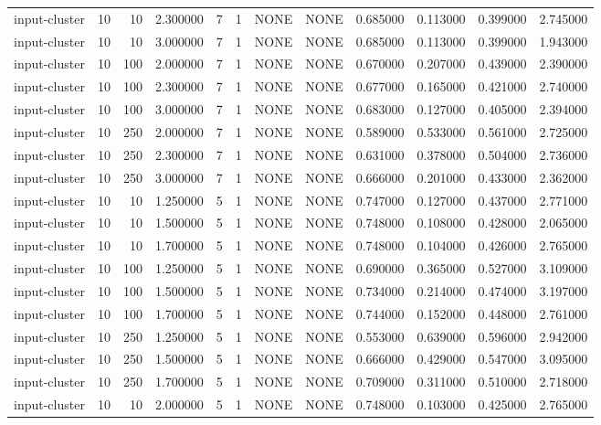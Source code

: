 \begin{tabular}{lrrrllllrrrr}
input-cluster & 10 & 10 & 2.300000 & 7 & 1 & NONE & NONE & 0.685000 & 0.113000 & 0.399000 & 2.745000 \\
input-cluster & 10 & 10 & 3.000000 & 7 & 1 & NONE & NONE & 0.685000 & 0.113000 & 0.399000 & 1.943000 \\
input-cluster & 10 & 100 & 2.000000 & 7 & 1 & NONE & NONE & 0.670000 & 0.207000 & 0.439000 & 2.390000 \\
input-cluster & 10 & 100 & 2.300000 & 7 & 1 & NONE & NONE & 0.677000 & 0.165000 & 0.421000 & 2.740000 \\
input-cluster & 10 & 100 & 3.000000 & 7 & 1 & NONE & NONE & 0.683000 & 0.127000 & 0.405000 & 2.394000 \\
input-cluster & 10 & 250 & 2.000000 & 7 & 1 & NONE & NONE & 0.589000 & 0.533000 & 0.561000 & 2.725000 \\
input-cluster & 10 & 250 & 2.300000 & 7 & 1 & NONE & NONE & 0.631000 & 0.378000 & 0.504000 & 2.736000 \\
input-cluster & 10 & 250 & 3.000000 & 7 & 1 & NONE & NONE & 0.666000 & 0.201000 & 0.433000 & 2.362000 \\
input-cluster & 10 & 10 & 1.250000 & 5 & 1 & NONE & NONE & 0.747000 & 0.127000 & 0.437000 & 2.771000 \\
input-cluster & 10 & 10 & 1.500000 & 5 & 1 & NONE & NONE & 0.748000 & 0.108000 & 0.428000 & 2.065000 \\
input-cluster & 10 & 10 & 1.700000 & 5 & 1 & NONE & NONE & 0.748000 & 0.104000 & 0.426000 & 2.765000 \\
input-cluster & 10 & 100 & 1.250000 & 5 & 1 & NONE & NONE & 0.690000 & 0.365000 & 0.527000 & 3.109000 \\
input-cluster & 10 & 100 & 1.500000 & 5 & 1 & NONE & NONE & 0.734000 & 0.214000 & 0.474000 & 3.197000 \\
input-cluster & 10 & 100 & 1.700000 & 5 & 1 & NONE & NONE & 0.744000 & 0.152000 & 0.448000 & 2.761000 \\
input-cluster & 10 & 250 & 1.250000 & 5 & 1 & NONE & NONE & 0.553000 & 0.639000 & 0.596000 & 2.942000 \\
input-cluster & 10 & 250 & 1.500000 & 5 & 1 & NONE & NONE & 0.666000 & 0.429000 & 0.547000 & 3.095000 \\
input-cluster & 10 & 250 & 1.700000 & 5 & 1 & NONE & NONE & 0.709000 & 0.311000 & 0.510000 & 2.718000 \\
input-cluster & 10 & 10 & 2.000000 & 5 & 1 & NONE & NONE & 0.748000 & 0.103000 & 0.425000 & 2.765000 \\

\end{tabular}
